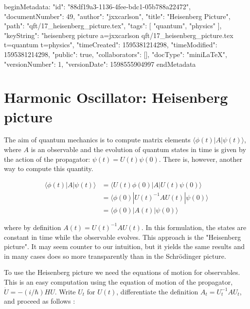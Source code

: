 beginMetadata:
{
    "id": "88df19a3-1136-4fee-bdc1-05b788a22472",
    "documentNumber": 49,
    "author": "jxxcarlson",
    "title": "Heisenberg Picture",
    "path": "qft/17_heisenberg_picture.tex",
    "tags": [
        "quantum",
        "physics"
    ],
    "keyString": "heisenberg picture a=jxxcarlson qft/17_heisenberg_picture.tex t=quantum t=physics",
    "timeCreated": 1595381214298,
    "timeModified": 1595381214298,
    "public": true,
    "collaborators": [],
    "docType": "miniLaTeX",
    "versionNumber": 1,
    "versionDate": 1598555904997
}
endMetadata


\setcounter{section}{17}


\section{Harmonic Oscillator: Heisenberg picture}

\innertableofcontents


The aim of quantum mechanics is to compute matrix elements $\langle \phi(t) | A | \psi(t) \rangle$, where $A$ is an observable and the evolution of quantum states in time is given by the action of the propagator: $\psi(t) = U(t)\psi(0)$.  There is, however, another way to compute this quantity.

\begin{align}
\langle \phi(t) | A | \psi(t) \rangle &= \langle U(t) \phi(0) | A | U(t) \psi(0) \rangle \\
&= \langle \phi(0) | U(t) ^{-1}A U(t) |  \psi(0) \rangle \\
&= \langle \phi(0) | A(t)|  \psi(0) \rangle
\end{align}

where by definition $A(t) = U(t) ^{-1}A U(t)$. In this formulation,
the states are constant in time while the observable evolves.
This approach is the "Heisenberg picture". It may seem counter to our intuition, but it yields the same results and in many cases does so more transparently than in the Schrödinger picture.

To use the Heisenberg picture we need the equations of motion for observables.  This is an easy computation using the equation of motion of the propagator, $\dot U = -(i/\hbar) HU$.  Write $U_t$ for $U(t)$, differentiate the definition $A_t = U_t^{-1}A U_t$, and proceed as follows :

